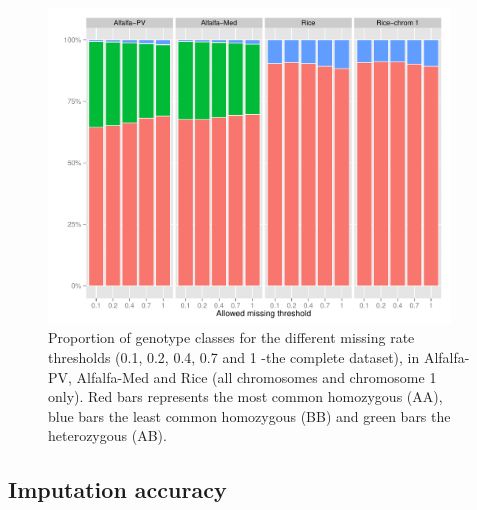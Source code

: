 \begin{figure}
\includegraphics[width=0.95\textwidth]{Fig01_class_breakdown_all.pdf}
\caption[Proportions of genotype classes]{​Proportion of genotype classes for the different missing rate thresholds (0.1, 0.2, 0.4, 0.7 and 1 -the complete dataset), in Alfalfa-PV, Alfalfa-Med and Rice (all chromosomes and chromosome 1 only). Red bars represents the most common homozygous (AA), blue bars the least common homozygous (BB) and green bars the heterozygous (AB).}
\label{fig:genotype_classes}
\end{figure}

\subsection{Imputation accuracy}
\label{sec:imputation_accuracy}  

